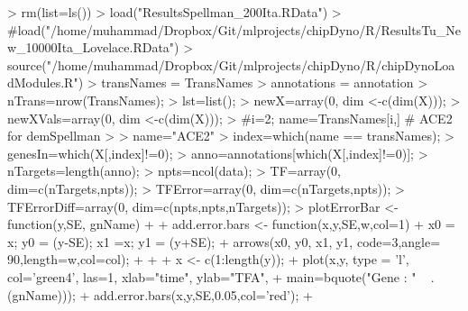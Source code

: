 \documentclass{article}
\begin{document}
\begin{Schunk}
\begin{Sinput}
> rm(list=ls())
> load("ResultsSpellman_200Ita.RData")
> #load("/home/muhammad/Dropbox/Git/mlprojects/chipDyno/R/ResultsTu_New_10000Ita_Lovelace.RData")
> source("/home/muhammad/Dropbox/Git/mlprojects/chipDyno/R/chipDynoLoadModules.R")
> transNames = TransNames
> annotations = annotation
> nTrans=nrow(TransNames);
> lst=list();
> newX=array(0, dim <-c(dim(X)));
> newXVals=array(0, dim <-c(dim(X)));
> #i=2; name=TransNames[i,] # ACE2 for demSpellman
> 
> name="ACE2"
> index=which(name == transNames);
> genesIn=which(X[,index]!=0);
> anno=annotations[which(X[,index]!=0)];
> nTargets=length(anno);
> npts=ncol(data);
> TF=array(0, dim=c(nTargets,npts));
> TFError=array(0, dim=c(nTargets,npts));
> TFErrorDiff=array(0, dim=c(npts,npts,nTargets));
> plotErrorBar <- function(y,SE, gnName){
+  
+ add.error.bars <- function(x,y,SE,w,col=1){
+  x0 = x; y0 = (y-SE); x1 =x; y1 = (y+SE);
+  arrows(x0, y0, x1, y1, code=3,angle= 90,length=w,col=col);
+  }
+  
+ x <- c(1:length(y));
+ plot(x,y, type = 'l', col='green4', las=1, xlab="time", ylab="TFA", 
+       main=bquote("Gene : " ~ .(gnName)));
+ add.error.bars(x,y,SE,0.05,col='red');
+ }
\end{Sinput}
\end{Schunk}
\end{document}
